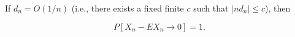 If $d_n = O(1/n)$ (i.e., there exists a fixed finite $c$ such that $|n d_n| \leq c$), then

$$P[X_n - EX_n \to 0] = 1.$$
